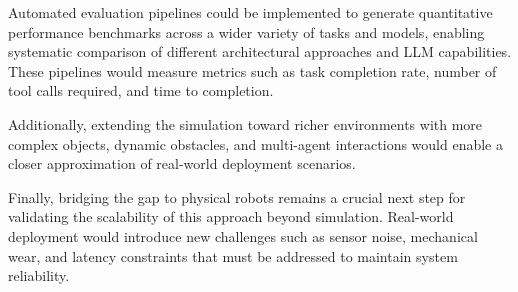 \documentclass[../report.tex]{subfiles}
\begin{document}
Automated evaluation pipelines could be implemented to generate quantitative performance benchmarks across a wider variety of tasks and models, enabling systematic comparison of different architectural approaches and LLM capabilities. These pipelines would measure metrics such as task completion rate, number of tool calls required, and time to completion.

Additionally, extending the simulation toward richer environments with more complex objects, dynamic obstacles, and multi-agent interactions would enable a closer approximation of real-world deployment scenarios.

Finally, bridging the gap to physical robots remains a crucial next step for validating the scalability of this approach beyond simulation. Real-world deployment would introduce new challenges such as sensor noise, mechanical wear, and latency constraints that must be addressed to maintain system reliability.
\end{document}
